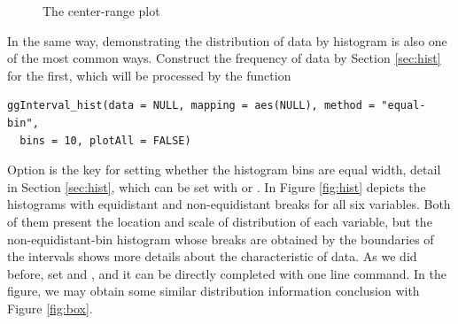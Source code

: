 \documentclass[article]{jss}
\begin{document}
\begin{figure}[htbp]
    
    \centering
    \caption{\label{fig:centerRange}The center-range plot}
\end{figure}


In the same way, demonstrating the distribution of data by histogram is also one of the most common ways. Construct the frequency of data by Section \ref{sec:hist} for the first, which will be processed by the function

\begin{verbatim}
ggInterval_hist(data = NULL, mapping = aes(NULL), method = "equal-bin",
  bins = 10, plotAll = FALSE)
\end{verbatim}

Option  is the key for setting whether the histogram bins are equal width, detail in Section \ref{sec:hist}, which can be set with  or . In Figure \ref{fig:hist} depicts the histograms with equidistant and non-equidistant breaks for all six variables. Both of them present the location and scale of distribution of each variable, but the non-equidistant-bin histogram whose breaks are obtained by the boundaries of the intervals shows more details about the characteristic of data. As we did before, set  and , and it can be directly completed with one line command. In the figure, we may obtain some similar distribution information conclusion with Figure \ref{fig:box}.
\end{document}
